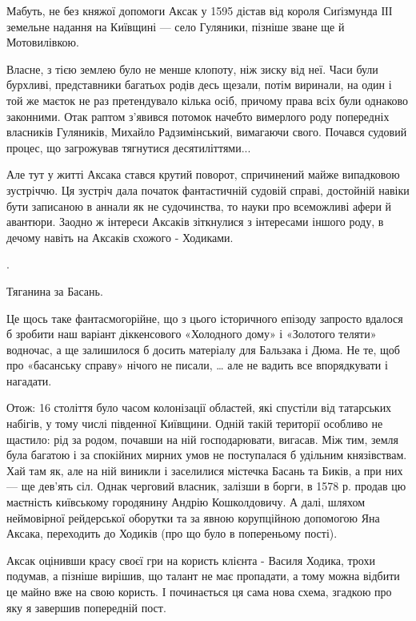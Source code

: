 Мабуть, не без княжої допомоги Аксак у 1595 дістав від короля Сиґізмунда ІІІ
земельне надання на Київщині — село Гуляники, пізніше зване ще й Мотовилівкою.

Власне, з тією землею було не менше клопоту, ніж зиску від неї. Часи були
бурхливі, представники багатьох родів десь щезали, потім виринали, на один і
той же маєток не раз претендувало кілька осіб, причому права всіх були однаково
законними. Отак раптом з’явився потомок начебто вимерлого роду попередніх
власників Гуляників, Михайло Радзимінський, вимагаючи свого. Почався судовий
процес, що загрожував тягнутися десятиліттями...

Але тут у житті Аксака стався крутий поворот, спричинений майже випадковою
зустріччю. Ця зустріч дала початок фантастичній судовій справі, достойній
навіки бути записаною в аннали як не судочинства, то науки про всеможливі афери
й авантюри. Заодно ж інтереси Аксаків зіткнулися з інтересами іншого роду, в
дечому навіть на Аксаків схожого - Ходиками.

.

Тяганина за Басань.

Це щось таке фантасмогорійне, що з цього історичного епізоду запросто вдалося б
зробити наш варіант діккенсового «Холодного дому» і «Золотого теляти» водночас,
а ще залишилося б досить матеріалу для Бальзака і Дюма. Не те, щоб про
«басанську справу» нічого не писали, … але не вадить все впорядкувати і
нагадати. 

Отож: 16 століття було часом колонізації областей, які спустіли від татарських
набігів, у тому числі південної Київщини. Одній такій території особливо не
щастило: рід за родом, почавши на ній господарювати, вигасав. Між тим, земля
була багатою і за спокійних мирних умов не поступалася б удільним князівствам.
Хай там як, але на ній виникли і заселилися містечка Басань та Биків, а при них
— ще дев’ять сіл. Однак черговий власник, залізши в борги, в 1578 р. продав цю
маєтність київському городянину Андрію Кошколдовичу. А далі, шляхом неймовірної
рейдерської оборутки та за явною корупційною допомогою Яна Аксака, переходить
до Ходиків (про що було в попереньому пості).

Аксак оцінивши красу своєї гри на користь клієнта - Василя Ходика, трохи
подумав, а пізніше вирішив, що талант не має пропадати, а тому можна відбити це
майно вже на свою користь. І починається ця сама нова схема, згадкою про яку я
завершив попередній пост.


